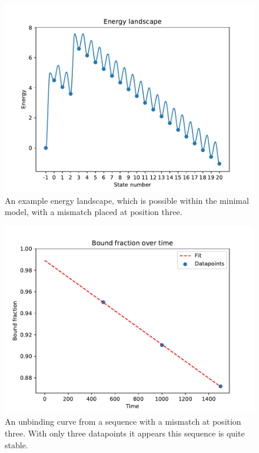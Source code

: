 \begin{figure}
\begin{center}
\includegraphics[width=\textwidth]{images/RDRLandscapeExample1}
\caption{An example energy landscape, which is possible within the minimal model, with a mismatch placed at position three.}
\label{fig:RDRExample1}
\end{center}
\end{figure}

\begin{figure}
\begin{center}
\includegraphics[width=\textwidth]{images/RDRBindingExample1}
\caption{An unbinding curve from a sequence with a mismatch at position three. With only three datapoints it appears this sequence is quite stable.}
\label{fig:RDRBindingExample1}
\end{center}
\end{figure}

